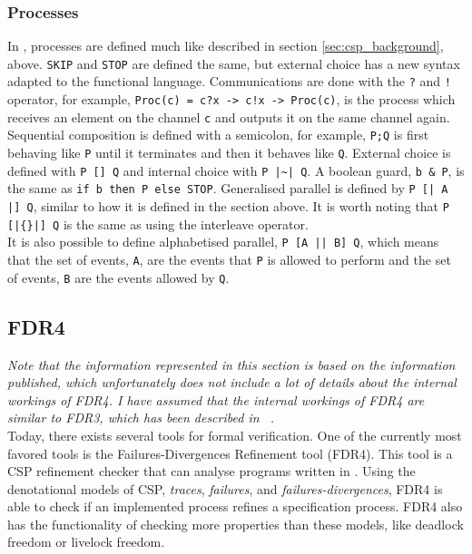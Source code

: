 \subsubsection{\cspm{} Processes}
In \cspm{}, processes are defined much like described in section \ref{sec:csp_background}, above. \texttt{SKIP} and \texttt{STOP} are defined the same, but external choice has a new syntax adapted to the functional language. Communications are done with the \texttt{?} and \texttt{!} operator, for example, \texttt{Proc(c) = c?x -> c!x -> Proc(c)}, is the process which receives an element on the channel \texttt{c} and outputs it on the same channel again.
Sequential composition is defined with a semicolon, for example, \texttt{P;Q} is first behaving like \texttt{P} until it terminates and then it behaves like \texttt{Q}.
External choice is defined with \texttt{P [] Q} and internal choice with \texttt{P |\textasciitilde| Q}. A boolean guard, \texttt{b \& P}, is the same as \texttt{if b then P else STOP}.
Generalised parallel is defined by \texttt{P [| A |] Q}, similar to how it is defined in the section above. It is worth noting that \texttt{P [|\{\}|] Q} is the same as using the interleave operator. \\
It is also possible to define alphabetised parallel, \texttt{P [A || B] Q}, which means that the set of events, \texttt{A}, are the events that \texttt{P} is allowed to perform and the set of events, \texttt{B} are the events allowed by \texttt{Q}.
%

\subsection{FDR4}
\label{sec:background_fdr}
\textit{Note that the information represented in this section is based on the information published, which unfortunately does not include a lot of details about the internal workings of FDR4. I have assumed that the internal workings of FDR4 are similar to FDR3, which has been described in ~\cite{fdr}.}\\

Today, there exists several tools for formal verification. One of the currently most favored tools is the Failures-Divergences Refinement tool (FDR4). This tool is a CSP refinement checker that can analyse programs written in \cspm{}. Using the denotational models of CSP, \textit{traces}, \textit{failures}, and \textit{failures-divergences}, FDR4 is able to check if an implemented process refines a specification process. FDR4 also has the functionality of checking more properties than these models, like deadlock freedom or livelock freedom.\\

